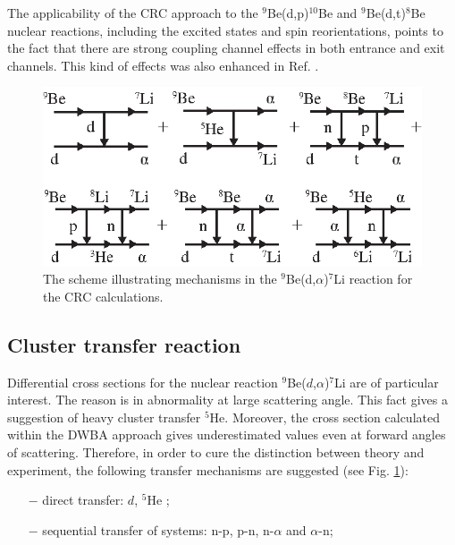\documentclass[10pt]{iopart}
\begin{document}
The applicability of the CRC approach to  the $^9$Be(d,p)$^{10}$Be and $^9$Be(d,t)$^{8}$Be nuclear reactions, including the excited states and spin reorientations, points to the fact that there are strong coupling channel effects in both entrance and exit channels. This kind  of effects was also enhanced in Ref. \cite{harakeh1980, rudchik2016}. 


\begin{figure}[tp]
\centering
\includegraphics[scale=0.8]{4HE7LiCC.eps}
\caption{\label{4He7LICC} The scheme illustrating mechanisms in the $^9$Be(d,$\alpha$)$^7$Li reaction for the CRC calculations. }
\end{figure}	


\subsection{Cluster transfer reaction}
Differential cross sections for the nuclear reaction  ${^9}$Be($d$,$\alpha$)$^7$Li are of particular interest. The reason is in abnormality at large scattering angle. This fact gives a suggestion of heavy cluster transfer $^5$He. Moreover, the cross section calculated within the DWBA approach gives underestimated values even at forward angles of scattering. Therefore, in order to cure the distinction between theory and experiment, the following transfer mechanisms are suggested (see Fig. \ref{4He7LICC}): 
\begin{itemize}
\item[$-$] direct transfer: $d$, $^5$He ;
\item[$-$] sequential transfer of systems: n-p, p-n, n-$\alpha$ and $\alpha$-n;
\end{itemize}
\end{document}
